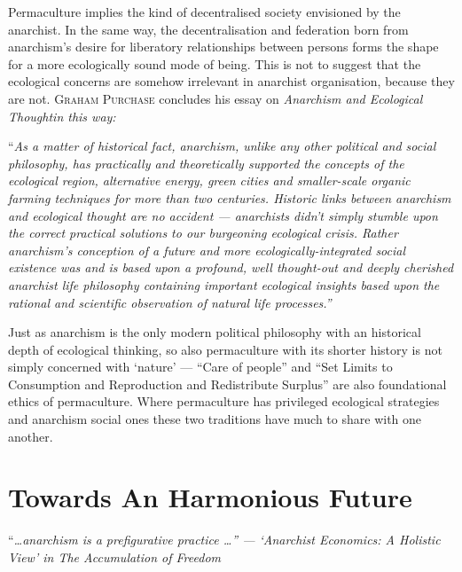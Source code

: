 \documentclass[a4paper, 11pt]{article}
\begin{document}
\begin{multicols*}{2}
Permaculture implies the kind of decentralised society envisioned by the anarchist.  In the same way, the decentralisation and federation born from anarchism's desire for liberatory relationships between persons forms the shape for a more ecologically sound mode of being.  This is not to suggest that the ecological concerns are somehow irrelevant in anarchist organisation, because they are not.  \textsc{Graham Purchase} concludes his essay on \em{Anarchism and Ecological Thought}\em in this way:

\vspace{1mm}
``\em{As a matter of historical fact, anarchism, unlike any other political and social philosophy, has practically and theoretically supported the concepts of the ecological region, alternative energy, green cities and smaller-scale organic farming techniques for more than two centuries.  Historic links between anarchism and ecological thought are no accident --- anarchists didn't simply stumble upon the correct practical solutions to our burgeoning ecological crisis.  Rather anarchism's conception of a future and more ecologically-integrated social existence was and is based upon a profound, well thought-out and deeply cherished anarchist life philosophy containing important ecological insights based upon the rational and scientific observation of natural life processes.}\em'' 
\vspace{1mm}

Just as anarchism is the only modern political philosophy with an historical depth of ecological thinking, so also permaculture with its shorter history is not simply concerned with `nature' --- ``Care of people'' and ``Set Limits to Consumption and Reproduction and Redistribute Surplus'' are also foundational ethics of permaculture.  Where permaculture has privileged ecological strategies and anarchism social ones these two traditions have much to share with one another.

\section*{Towards An Harmonious Future}

``\em{\ldots anarchism is a \em prefigurative \em practice \ldots }\em'' --- `Anarchist Economics: A Holistic View' in \em{The Accumulation of Freedom}\em
\vspace{1mm}


\end{multicols*}
\end{document}
